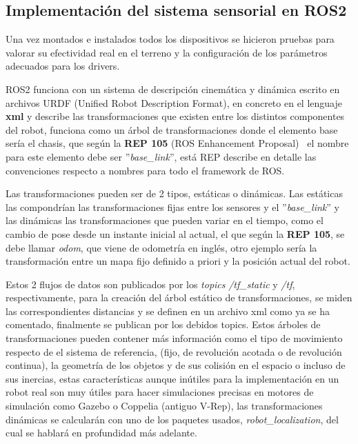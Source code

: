 \subsection{Implementación del sistema sensorial en ROS2}

Una vez montados e instalados todos los dispositivos se hicieron pruebas para valorar su efectividad real en el terreno y la configuración 
de los parámetros adecuados para los drivers.

ROS2 funciona con un sistema de descripción cinemática y dinámica escrito en archivos URDF (Unified Robot Description Format), en concreto en 
el lenguaje \textbf{xml} y describe las transformaciones que existen entre los distintos componentes del robot, funciona como un árbol de 
transformaciones donde el elemento base sería el chasis, que según la \textbf{REP 105} (ROS Enhancement Proposal)~\cite{rep105} el nombre para este 
elemento debe ser ''\textit{base\_link}'', está REP describe en detalle las convenciones respecto a nombres para todo el framework de ROS. 

Las transformaciones pueden ser de 2 tipos, estáticas o dinámicas. Las estáticas las compondrían las transformaciones fijas entre los 
sensores y el ''\textit{base\_link}'' y las dinámicas las transformaciones que pueden variar en el tiempo, como el cambio de pose desde 
un instante inicial al actual, el que según la \textbf{REP 105}, se debe llamar \textit{odom}, que viene de odometría en inglés, otro 
ejemplo sería la transformación entre un mapa fijo definido a priori y la posición actual del robot.

Estos 2 flujos de datos son publicados 
por los \textit{topics} \textit{/tf\_static} y \textit{/tf}, respectivamente, para la creación del árbol estático de transformaciones, se 
miden las correspondientes distancias y se definen en un archivo xml como ya se ha comentado, finalmente se publican por los debidos topics. 
Estos árboles de transformaciones pueden contener más información como el tipo de movimiento respecto de el sistema de referencia, 
(fijo, de revolución acotada o de revolución continua), la geometría de los objetos y de sus colisión en el espacio o incluso de sus 
inercias, estas características aunque inútiles para la implementación en un robot real son muy útiles para hacer simulaciones precisas 
en motores de simulación como Gazebo o Coppelia (antiguo V-Rep), las transformaciones dinámicas se calcularán con uno de 
los paquetes usados, \textit{robot\_localization}, del cual se hablará en profundidad más adelante.

